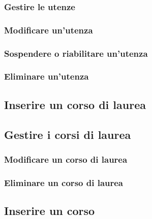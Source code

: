\documentclass [a4paper,11pt]{book}
\begin{document}
\medskip

\subsubsection{Gestire le utenze}


\subsubsection{Modificare un'utenza}

\medskip

\subsubsection{Sospendere o riabilitare un'utenza}

\medskip

\subsubsection{Eliminare un'utenza}

\medskip

\subsection{Inserire un corso di laurea}

\medskip

\subsection{Gestire i corsi di laurea}

\subsubsection{Modificare un corso di laurea}

\medskip

\subsubsection{Eliminare un corso di laurea}

\medskip

\subsection{Inserire un corso}

\medskip
\end{document}
